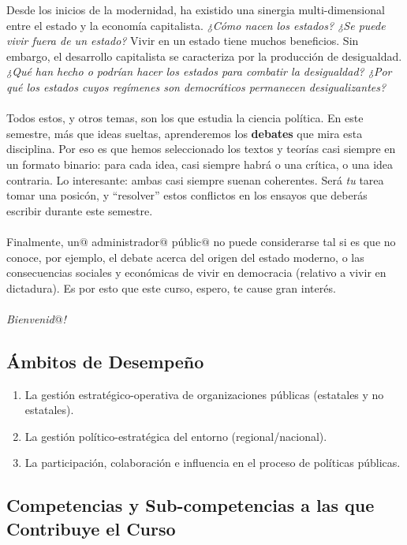 \documentclass[letterpaper]{article}
\begin{document}
Desde los inicios de la modernidad, ha existido una sinergia multi-dimensional entre el estado y la econom\'ia capitalista. \emph{¿C\'omo nacen los estados? ¿Se puede vivir fuera de un estado?} Vivir en un estado tiene muchos beneficios. Sin embargo, el desarrollo capitalista se caracteriza por la producci\'on de desigualdad. \emph{¿Qu\'e han hecho o podr\'ian hacer los estados para combatir la desigualdad? ¿Por qu\'e los estados cuyos reg\'imenes son democr\'aticos permanecen desigualizantes?}  
\\
\\
Todos estos, y otros temas, son los que estudia la ciencia pol\'itica. En este semestre, m\'as que ideas sueltas, aprenderemos los {\bf debates} que mira esta disciplina. Por eso es que hemos seleccionado los textos y teor\'ias casi siempre en un formato binario: para cada idea, casi siempre habr\'a o una cr\'itica, o una idea contraria. Lo interesante: ambas casi siempre suenan coherentes. Ser\'a \emph{tu} tarea tomar una posic\'on, y ``resolver'' estos conflictos en los ensayos que deber\'as escribir durante este semestre. 
\\
\\
Finalmente, un$@$ administrador$@$ p\'ublic$@$ no puede considerarse tal si es que no conoce, por ejemplo, el debate acerca del origen del estado moderno, o las consecuencias sociales y econ\'omicas de vivir en democracia (relativo a vivir en dictadura). Es por esto que este curso, espero, te cause gran inter\'es.
\\
\\
\emph{Bienvenid$@$!}


\subsection*{\'Ambitos de Desempe\~no}

\begin{enumerate}
  \item La gesti\'on estrat\'egico-operativa de organizaciones p\'ublicas (estatales y no estatales).
  \item La gesti\'on pol\'itico-estrat\'egica del entorno (regional/nacional).
  \item La participaci\'on, colaboraci\'on e influencia en el proceso de pol\'iticas p\'ublicas.
\end{enumerate}


\subsection*{Competencias y Sub-competencias a las que Contribuye el Curso}
\end{document}
